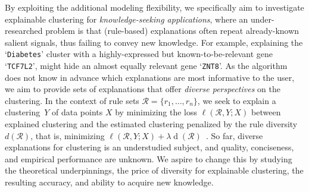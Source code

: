 \documentclass[a4paper,11pt]{article}
\begin{document}
By exploiting the additional modeling flexibility, 
we specifically aim to investigate explainable clustering for \emph{knowledge-seeking applications}, 
where an under-researched problem is that (rule-based) explanations 
often repeat already-known salient signals, thus failing to convey new knowledge.
For example, 
explaining the `\texttt{\small Diabetes}' cluster with a highly-expressed 
but known-to-be-relevant gene `\texttt{\small TCF7L2}', 
might hide an almost equally relevant gene `\texttt{\small ZNT8}'.  
As the algorithm does not know in advance which explanations are most informative to the user, 
we aim to provide sets of explanations that offer \emph{diverse perspectives} on the clustering.
In the context of rule sets $\mathcal{R} = \{r_1, \dots, r_n\}$, 
we seek to explain a clustering~$Y$ of data points $X$ 
by minimizing the loss $\ell(\mathcal{R},Y;X)$ between explained clustering and the estimated clustering 
penalized by the rule diversity~$d(\mathcal{R})$, 
that is, minimizing $\ell(\mathcal{R},Y;X) + \lambda \operatorname{d}(\mathcal{R})$~\cite{zhang2020diverse}.
So far, diverse explanations for clustering is an understudied subject, and quality, conciseness, and empirical performance are unknown. 
We aspire to change this by studying the theoretical underpinnings, 
the price of diversity for explainable clustering, 
the resulting accuracy, and ability to acquire new knowledge. 
\end{document}
